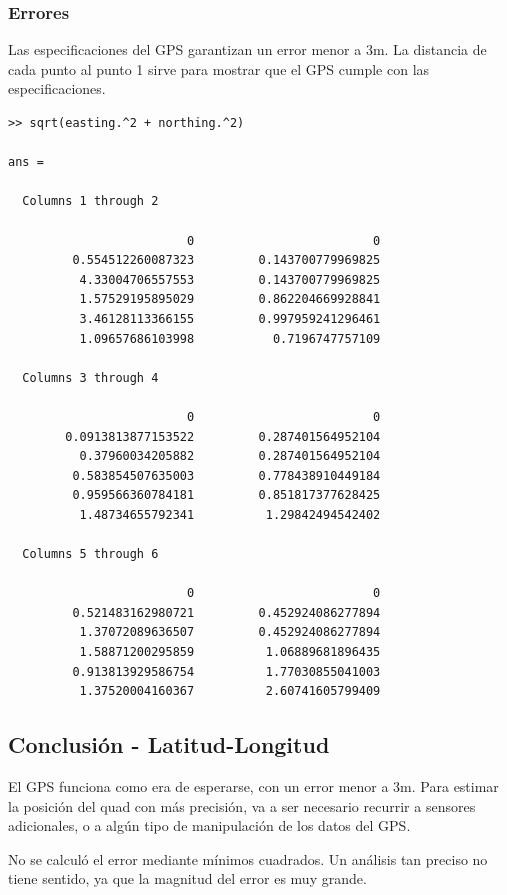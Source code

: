 \documentclass[spanish,12pt,a4paper,titlepage]{report}
\begin{document}
\newpage
\subsubsection*{Errores}
\label{sec:errores}

Las especificaciones del GPS garantizan un error menor a 3m. La distancia de cada punto al punto 1 sirve para mostrar que el GPS cumple con las especificaciones. 

\begin{verbatim}
>> sqrt(easting.^2 + northing.^2)

ans =

  Columns 1 through 2

                         0                         0
         0.554512260087323         0.143700779969825
          4.33004706557553         0.143700779969825
          1.57529195895029         0.862204669928841
          3.46128113366155         0.997959241296461
          1.09657686103998           0.7196747757109

  Columns 3 through 4

                         0                         0
        0.0913813877153522         0.287401564952104
          0.37960034205882         0.287401564952104
         0.583854507635003         0.778438910449184
         0.959566360784181         0.851817377628425
          1.48734655792341          1.29842494542402

  Columns 5 through 6

                         0                         0
         0.521483162980721         0.452924086277894
          1.37072089636507         0.452924086277894
          1.58871200295859          1.06889681896435
         0.913813929586754          1.77030855041003
          1.37520004160367          2.60741605799409
\end{verbatim}

\subsection{Conclusión - Latitud-Longitud}
\label{sec:error-lat-lon-conclusion}

El GPS funciona como era de esperarse, con un error menor a 3m. Para estimar la posición del quad con más precisión, va a ser necesario recurrir a sensores adicionales, o a algún tipo de manipulación de los datos del GPS.

No se calculó el error mediante mínimos cuadrados. Un análisis tan preciso no tiene sentido, ya que la magnitud del error es muy grande.
\end{document}
